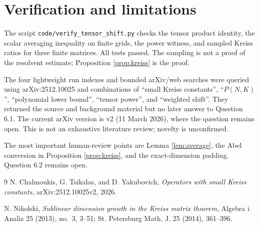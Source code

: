 \documentclass[10pt]{article}
\begin{document}
\section{Verification and limitations}

The script \texttt{code/verify\_tensor\_shift.py} checks the tensor product
identity, the scalar averaging inequality on finite grids, the power witness,
and sampled Kreiss ratios for three finite matrices.  All tests passed.  The
sampling is not a proof of the resolvent estimate; Proposition
\ref{prop:kreiss} is the proof.

The four lightweight run indexes and bounded arXiv/web searches were queried
using arXiv:2512.10025 and combinations of ``small Kreiss constants'',
``$P(N,K)$'', ``polynomial lower bound'', ``tensor power'', and ``weighted
shift''.  They returned the source and background material but no later answer
to Question 6.1.  The current arXiv version is v2 (11 March 2026), where the
question remains open.  This is not an exhaustive literature review; novelty
is unconfirmed.

The most important human-review points are Lemma \ref{lem:average}, the Abel
conversion in Proposition \ref{prop:kreiss}, and the exact-dimension padding.
Question 6.2 remains open.

\begin{thebibliography}{9}
N. Chalmoukis, G. Tsikalas, and D. Yakubovich,
\emph{Operators with small Kreiss constants}, arXiv:2512.10025v2, 2026.

N. Nikolski,
\emph{Sublinear dimension growth in the Kreiss matrix theorem},
Algebra i Analiz 25 (2013), no.~3, 3--51;
St. Petersburg Math. J. 25 (2014), 361--396.
\end{thebibliography}
\end{document}

